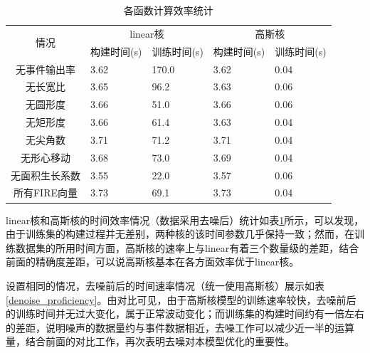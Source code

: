 \begin{table}[ht]
    \centering
    \caption{各函数计算效率统计}
    \begin{tabularx}{\textwidth}{c|X|X|X|X}
    \toprule
    \multicolumn{1}{c|}{\multirow{2}{*}{情况}} & \multicolumn{2}{c|}{linear核} & \multicolumn{2}{c}{高斯核} \\ \cmidrule(l){2-5} 
    \multicolumn{1}{c|}{}  & 构建时间(s)     & 训练时间(s)    & 构建时间(s)     & 训练时间(s)  \\
    \midrule
    无事件输出率      &3.62       &170.0      &3.62       &0.04       \\
    无长宽比         &3.65       &96.2       &3.63       &0.06       \\
    无圆形度         &3.66       &51.0       &3.66       &0.06       \\
    无矩形度         &3.66       &61.4       &3.63       &0.04       \\
    无尖角数         &3.71       &71.2       &3.71       &0.04       \\
    无形心移动       &3.68       &73.0       &3.69       &0.04       \\
    无面积生长系数    &3.55       &22.0       &3.57       &0.06       \\
    所有FIRE向量     &3.73       &69.1       &3.73       &0.04       \\
    \bottomrule
    \end{tabularx}
    \label{kernel_proficiency}
\end{table}

linear核和高斯核的时间效率情况（数据采用去噪后）统计如表\ref{kernel_proficiency}所示，可以发现，由于训练集的构建过程并无差别，两种核的该时间参数几乎保持一致；然而，在训练数据集的所用时间方面，高斯核的速率上与linear有着三个数量级的差距，结合前面的精确度差距，可以说高斯核基本在各方面效率优于linear核。

设置相同的情况，去噪前后的时间速率情况（统一使用高斯核）展示如表\ref{denoise_proficiency}。由对比可见，由于高斯核模型的训练速率较快，去噪前后的训练时间并无过大变化，属于正常波动变化；而训练集的构建时间约有一倍左右的差距，说明噪声的数据量约与事件数据相近，去噪工作可以减少近一半的运算量，结合前面的对比工作，再次表明去噪对本模型优化的重要性。

